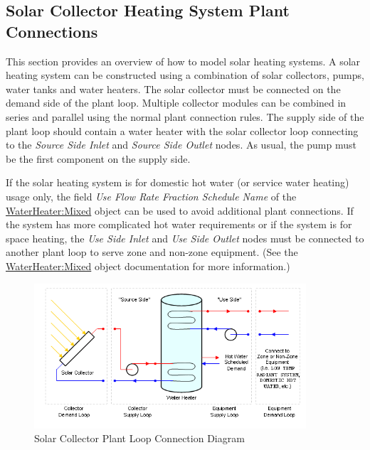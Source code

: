 \subsection{Solar Collector Heating System Plant Connections}\label{solar-collector-heating-system-plant-connections}

This section provides an overview of how to model solar heating systems. A solar heating system can be constructed using a combination of solar collectors, pumps, water tanks and water heaters. The solar collector must be connected on the demand side of the plant loop. Multiple collector modules can be combined in series and parallel using the normal plant connection rules. The supply side of the plant loop should contain a water heater with the solar collector loop connecting to the \emph{Source Side Inlet} and \emph{Source Side Outlet} nodes. As usual, the pump must be the first component on the supply side.

If the solar heating system is for domestic hot water (or service water heating) usage only, the field \emph{Use Flow Rate Fraction Schedule Name} of the \hyperref[waterheatermixed]{WaterHeater:Mixed} object can be used to avoid additional plant connections. If the system has more complicated hot water requirements or if the system is for space heating, the \emph{Use Side Inlet} and \emph{Use Side Outlet} nodes must be connected to another plant loop to serve zone and non-zone equipment. (See the \hyperref[waterheatermixed]{WaterHeater:Mixed} object documentation for more information.)

\begin{figure}[hbtp] %
\centering
\includegraphics[width=0.9\textwidth, height=0.9\textheight, keepaspectratio=true]{media/image339.png}
\caption{Solar Collector Plant Loop Connection Diagram \protect \label{fig:solar-collector-plant-loop-connection-diagram}}
\end{figure}

